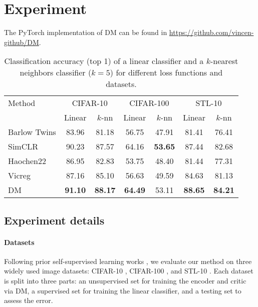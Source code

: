 \section{Experiment}
The PyTorch implementation of DM can be found in \href{https://github.com/vincen-github/DM}{https://github.com/vincen-github/DM}.
\begin{table}[htbp]
    \centering
    \renewcommand{\arraystretch}{1.25}
    \begin{tabular}{@{}lcccccc@{}}
        \toprule
        Method & \multicolumn{2}{c}{CIFAR-10} & \multicolumn{2}{c}{CIFAR-100} & \multicolumn{2}{c}{STL-10} \\
        & Linear & $k$-nn & Linear & $k$-nn & Linear & $k$-nn \\
        \midrule
        Barlow Twins \citep{zbontar2021barlow} & 83.96 & 81.18 & 56.75 & 47.91 & 81.41 & 76.41 \\
        SimCLR \citep{chen2020simclr} & 90.23 & 87.57 & 64.16 & \textbf{53.65} & 87.44 & 82.68 \\
        Haochen22 \citep{haochen2022beyond} & 86.95 & 82.83 & 53.75 & 48.40 & 81.44 & 77.31 \\
        Vicreg \citep{adrien2022vicreg} & 87.16 &  85.10 & 56.63 & 49.59 & 84.63 & 81.13 \\
        \midrule
        DM & \textbf{91.10} & \textbf{88.17} & \textbf{64.49} & 53.11 & \textbf{88.65} & \textbf{84.21} \\
        \bottomrule
    \end{tabular}
    \caption{Classification accuracy (top 1) of a linear classifier and a $k$-nearest neighbors classifier ($k = 5$) for different loss functions and datasets.}
    \label{tab:experiment_result}
\end{table}
\subsection{Experiment details}
\paragraph{Datasets}
Following prior self-supervised learning works \citep{chen2020simclr, ermolov2021whitening, zbontar2021barlow, haochen2021spectral, adrien2022vicreg}, we evaluate our method on three widely used image datasets: CIFAR-10 \citep{Krizhevsky09cifar}, CIFAR-100 \citep{Krizhevsky09cifar}, and STL-10 \citep{coates2011stl10}. Each dataset is split into three parts: an unsupervised set for training the encoder and critic via DM, a supervised set for training the linear classifier, and a testing set to assess the error.

